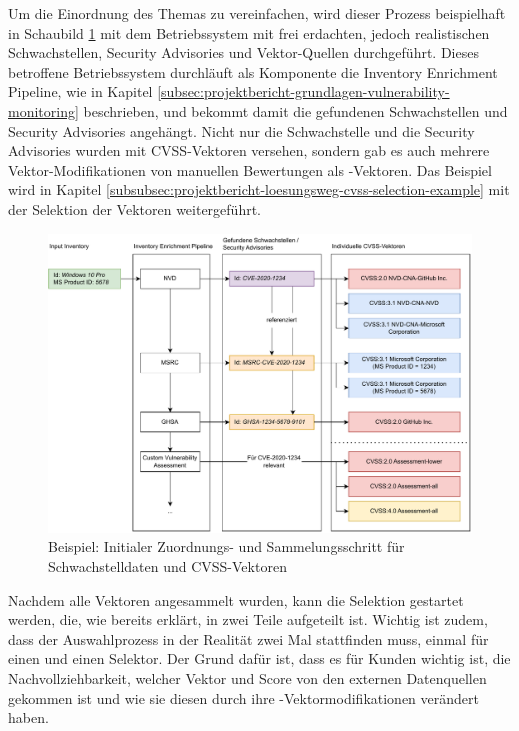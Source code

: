 Um die Einordnung des Themas zu vereinfachen, wird dieser Prozess beispielhaft in Schaubild \ref{fig:cvss-selection-process-collection} mit dem Betriebssystem  mit frei erdachten, jedoch realistischen Schwachstellen, Security Advisories und Vektor-Quellen durchgeführt.
Dieses betroffene Betriebssystem durchläuft als Komponente die Inventory Enrichment Pipeline, wie in Kapitel \ref{subsec:projektbericht-grundlagen-vulnerability-monitoring} beschrieben, und bekommt damit die gefundenen Schwachstellen und Security Advisories angehängt.
Nicht nur die Schwachstelle und die Security Advisories wurden mit CVSS-Vektoren versehen, sondern gab es auch mehrere Vektor-Modifikationen von manuellen Bewertungen als -Vektoren.
Das Beispiel wird in Kapitel \ref{subsubsec:projektbericht-loesungsweg-cvss-selection-example} mit der Selektion der Vektoren weitergeführt.

\begin{figure}[htbp] %
    \centering
    \includegraphics[width=1\textwidth, keepaspectratio]{res/grafiken/cvss-selection-process-collection}
    \caption{Beispiel: Initialer Zuordnungs- und Sammelungsschritt für Schwachstelldaten und CVSS-Vektoren}
    \label{fig:cvss-selection-process-collection}
\end{figure}

Nachdem alle Vektoren angesammelt wurden, kann die Selektion gestartet werden, die, wie bereits erklärt, in zwei Teile aufgeteilt ist.
Wichtig ist zudem, dass der Auswahlprozess in der Realität zwei Mal stattfinden muss, einmal für einen  und einen  Selektor.
Der Grund dafür ist, dass es für Kunden wichtig ist, die Nachvollziehbarkeit, welcher Vektor und Score von den externen Datenquellen gekommen ist und wie sie diesen durch ihre -Vektormodifikationen verändert haben.

